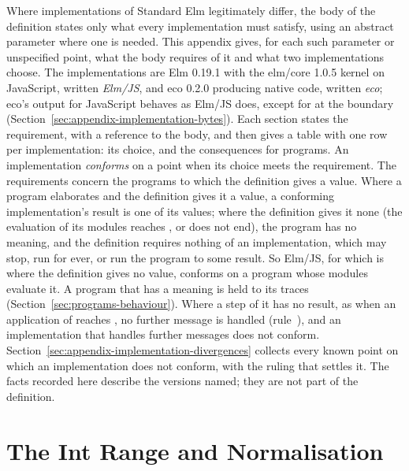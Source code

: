 Where implementations of Standard Elm legitimately differ, the body of the
definition states only what every implementation must satisfy, using an
abstract parameter where one is needed. %
This appendix gives, for each such parameter or unspecified point, what the
body requires of it and what two implementations choose. The implementations
are Elm 0.19.1 with the elm/core 1.0.5 kernel on JavaScript, written
\emph{Elm/JS}, and eco 0.2.0 producing native code, written \emph{eco}; eco's
output for JavaScript behaves as Elm/JS does, except for  at the
boundary (Section~\ref{sec:appendix-implementation-bytes}). Each section states the
requirement, with a reference to the body, and then gives a table with one row
per implementation: its choice, and the consequences for programs. An
implementation \emph{conforms} on a point when its choice meets the
requirement. The requirements concern the programs to which the definition
gives a value. Where a program elaborates and the definition gives it a value,
a conforming implementation's result is one of its values; where the
definition gives it none (the evaluation of its modules reaches
, or does not end), the program has no meaning, and the
definition requires nothing of an implementation, which may stop, run for
ever, or run the program to some result. So Elm/JS, for which
 is  where the definition gives no
value, conforms on a program whose modules evaluate it. %
A program that has a meaning is held to its traces
(Section~\ref{sec:programs-behaviour}). Where a step of it has no result, as
when an application of  reaches , no further message
is handled (rule~), and an implementation that handles
further messages does not conform. %
Section~\ref{sec:appendix-implementation-divergences} collects
every known point on which an implementation does not conform, with the
ruling that settles it. The facts recorded here describe the versions named;
they are not part of the definition.

\section{The Int Range and Normalisation}\label{sec:appendix-implementation-int}

